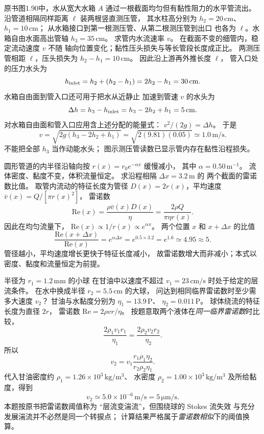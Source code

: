 
原书图1.90中，水从宽大水箱 $A$
通过一根截面均匀但有黏性阻力的水平管流出。
沿管道相隔同样距离 $\ell$ 装两根竖直测压管，
其水柱高分别为 $h_2=20\,\mathrm{cm}$、
$h_1=10\,\mathrm{cm}$；
从水箱接口到第一根测压管、从第二根测压管到出口
也各为 $\ell$。水箱自由水面高出管轴
$h_3=35\,\mathrm{cm}$。
求管内水流速率 $v$。
\exsolution
在截面不变的细管内，稳定流动速度 $v$ 不随
轴向位置变化；黏性压头损失与等长管段长度成正比。
两测压管相距 $\ell$，压头损失为
$h_2-h_1=10\,\mathrm{cm}$。
因此沿上游再外推长度 $\ell$，
管入口处的压力水头为
\[
h_{\rm inlet}=h_2+(h_2-h_1)
=2h_2-h_1=30\,\mathrm{cm}.
\]
水箱自由面到管入口还可用于把水从近静止
加速到管速 $v$ 的水头为
\[
\Delta h=h_3-h_{\rm inlet}
=h_3-2h_2+h_1=5\,\mathrm{cm}.
\]
对水箱自由面和管入口应用含上述分配的能量式：
$v^2/(2g)=\Delta h$。
于是
\[
\boxed{v=\sqrt{2g(h_3-2h_2+h_1)}
=\sqrt{2(9.81)(0.05)}
\simeq1.0\,\mathrm{m/s}}.
\]
\excheck 不能把全部 $h_3$ 当作动能水头；
图示测压管读数已显示管内存在黏性沿程损失。

圆形管道的内半径沿轴向按
$r(x)=r_0e^{-\alpha x}$ 缓慢减小，
其中 $\alpha=0.50\,\mathrm{m^{-1}}$。
流体密度、黏度不变，体积流量恒定。
求沿程相隔 $\Delta x=3.2\,\mathrm m$ 的
两个截面的雷诺数比值。
\exsolution
取管内流动的特征长度为管径
$D(x)=2r(x)$，平均速度
$\bar v(x)=Q/[\pi r(x)^2]$，
雷诺数
\[
\mathrm{Re}(x)=\frac{\rho\bar v(x)D(x)}{\eta}
=\frac{2\rho Q}{\pi\eta r(x)}.
\]
因此在均匀流量下，
$\mathrm{Re}(x)\propto1/r(x)\propto e^{\alpha x}$。
两个位置 $x$ 和 $x+\Delta x$ 的比值
\[
\boxed{\frac{\mathrm{Re}(x+\Delta x)}{\mathrm{Re}(x)}
=e^{\alpha\Delta x}=e^{0.5\times3.2}
=e^{1.6}\simeq4.95\approx5}.
\]
\excheck 管径越小，平均速度增长更快于特征长度减小，
故雷诺数增大而非减小；本式以密度、黏度和流量恒定为前提。

半径为 $r_1=1.2\,\mathrm{mm}$ 的小球
在甘油中以速度不超过
$v_1=23\,\mathrm{cm/s}$ 时处于给定的层流条件。
在水中换成半径
$r_2=5.5\,\mathrm{cm}$ 的大球，
问达到相同临界雷诺数时至少需多大速度 $v_2$？
甘油与水黏度分别为
$\eta_1=13.9\,\mathrm P$、
$\eta_2=0.011\,\mathrm P$。
\exsolution
球体绕流的特征长度为直径 $2r$，
雷诺数
$\mathrm{Re}=2\rho vr/\eta$。
按题意取两个液体在\emph{同一临界雷诺数}时比较，
\[
\frac{2\rho_1v_1r_1}{\eta_1}
=\frac{2\rho_2v_2r_2}{\eta_2}.
\]
所以
\[
\boxed{v_2=v_1
\frac{r_1\rho_1\eta_2}{r_2\rho_2\eta_1}}.
\]
代入甘油密度约
$\rho_1=1.26\times10^3\,\mathrm{kg/m^3}$、
水密度 $\rho_2=1.00\times10^3\,\mathrm{kg/m^3}$
及所给黏度，得到
\[
\boxed{v_2\simeq5.0\times10^{-6}\,\mathrm{m/s}
=5\,\mathrm{\mu m/s}}.
\]
\excheck 本题按原书把雷诺数阈值称为
“层流变湍流”，但围绕球的 Stokes 流失效
与充分发展湍流并不必然是同一个转捩点；
计算结果严格属于\emph{雷诺数相似}下的阈值换算。

